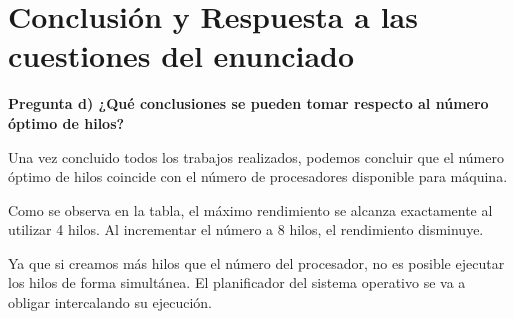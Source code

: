 \documentclass[12pt,a4paper]{article}
\begin{document}
\section{Conclusión y Respuesta a las cuestiones del enunciado}
\textbf{Pregunta d) ¿Qué conclusiones se pueden tomar respecto al número óptimo de hilos?}


Una vez concluido todos los trabajos realizados, podemos concluir que el número óptimo de hilos coincide con el número de procesadores disponible para máquina.


Como se observa en la tabla, el máximo rendimiento se alcanza exactamente al utilizar 4 hilos. Al incrementar el número a 8 hilos, el rendimiento disminuye.

Ya que si creamos más hilos que el número del procesador, no es posible ejecutar los hilos de forma simultánea. El planificador del sistema operativo se va a obligar intercalando su ejecución.
\end{document}
